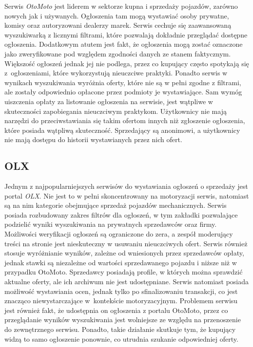 Serwis \emph{OtoMoto} jest liderem w sektorze kupna i sprzedaży pojazdów, zarówno nowych jak i używanych.
Ogłoszenia tam mogą wystawiać osoby prywatne, komisy oraz autoryzowani dealerzy marek.
Serwis cechuje się zaawansowaną wyszukiwarką z licznymi filtrami, które pozwalają dokładnie przeglądać dostępne ogłoszenia.
Dodatkowym atutem jest fakt, że ogłoszenia mogą zostać oznaczone jako zweryfikowane pod względem zgodności danych ze stanem faktycznym.
Większość ogłoszeń jednak jej nie podlega, przez co kupujący często spotykają się z~ogłoszeniami, które wykorzystują nieuczciwe praktyki.
Ponadto serwis w wynikach wyszukiwania wyróżnia oferty, które nie są w pełni zgodne z filtrami, ale zostały odpowiednio opłacone przez podmioty je wystawiające.
Sam wymóg uiszczenia opłaty za listowanie ogłoszenia na serwisie, jest wątpliwe w skuteczności zapobiegania nieuczciwym praktykom.
Użytkownicy nie mają narzędzi do przeciwstawiania się takim ofertom innych niż zgłoszenie ogłoszenia, które posiada wątpliwą skuteczność.
Sprzedający są anonimowi, a użytkownicy nie mają dostępu do historii wystawianych przez nich ofert.

\subsection{OLX}

Jednym z najpopularniejszych serwisów do wystawiania ogłoszeń o sprzedaży jest portal \emph{OLX}.
Nie jest to w pełni skoncentrowany na motoryzacji serwis, natomiast są na nim kategorie obejmujące sprzedaż pojazdów mechanicznych.
Serwis posiada rozbudowany zakres filtrów dla ogłoszeń, w tym zakładki pozwalające podzielić wyniki wyszukiwania na prywatnych sprzedawców oraz firmy.
Możliwości weryfikacji ogłoszeń są ograniczone do zera, a zespół moderujący treści na stronie jest nieskuteczny w usuwaniu nieuczciwych ofert.
Serwis również stosuje wyróżnianie wyników, zależne od wniesionych przez sprzedawców opłaty, jednak stawki są niezależne od wartości sprzedawanego pojazdu i niższe niż w przypadku OtoMoto.
Sprzedawcy posiadają profile, w których można sprawdzić aktualne oferty, ale ich archiwum nie jest udostępniane.
Serwis natomiast posiada możliwość wystawiania ocen, jednak tylko po sfinalizowaniu transakcji, co jest znacząco niewystarczające w~kontekście motoryzacyjnym.
Problemem serwisu jest również fakt, że udostępnia on ogłoszenia z portalu OtoMoto, przez co przeglądanie wyników wyszukiwania jest wolniejsze ze względu na przenoszenie do zewnętrznego serwisu.
Ponadto, takie działanie skutkuje tym, że kupujący widzą to samo ogłoszenie ponownie, co utrudnia szukanie odpowiedniej oferty.

